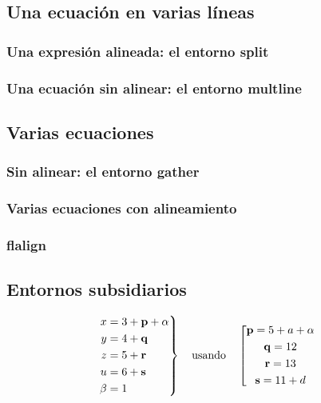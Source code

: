 \documentclass{article}
\numberwithin{equation}{section}
\theoremstyle{plain}
\theoremstyle{definition}
\theoremstyle{remark}
\begin{document}
\subsection{Una ecuación en varias líneas}


\subsubsection*{Una expresión alineada: el entorno split}


\subsubsection*{Una ecuación sin alinear: el entorno multline}

\subsection{Varias ecuaciones}

\subsubsection*{Sin alinear: el entorno gather}


\subsubsection*{Varias ecuaciones con alineamiento}

\subsubsection*{flalign}


\subsection{Entornos subsidiarios}
\[
\left.
\begin{aligned}[c]
 x & = 3 + \mathbf{p} + \alpha\\
      y & = 4 + \mathbf{q}\\
      z & = 5 + \mathbf{r}\\
      u & = 6 + \mathbf{s} \\
      \beta & = 1
\end{aligned} \right\}
\text{\quad usando\quad}
\left[
\begin{gathered}
      \mathbf{p} = 5 + a + \alpha\\
      \mathbf{q} = 12\\
      \mathbf{r} = 13\\
      \mathbf{s} = 11 + d
\end{gathered}
\right.
\]
\end{document}
